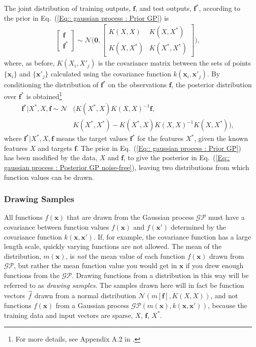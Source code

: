 \documentclass[twoside,english]{uiofysmaster}
\begin{document}
{{The joint distribution of training outputs, $\textbf{f}$, and test outputs, $\textbf{f}^*$, according to the prior in Eq.~(\ref{Eq:: gaussian process : Prior GP}) is
\begin{align}
\begin{bmatrix}
\textbf{f}\\
\textbf{f}^*
\end{bmatrix}
\sim 
\mathcal{N} \Bigg(
\boldsymbol{0},
\begin{bmatrix}
K(X, X) & K(X, X^*)\\
K(X, X^*) & K(X^*, X^*)
\end{bmatrix}
 \Bigg),
\end{align}
where, as before, $K(X_i, X'_j)$ is the covariance matrix between the sets of points $\{ \textbf{x}_i \}$ and $\{\textbf{x}'_j \}$ calculated using the covariance function $k(\textbf{x}_i, \textbf{x}'_j)$. By conditioning the distribution of $\textbf{f}^*$ on the observations $\textbf{f}$,  the posterior distribution over $\textbf{f}^*$ is obtained\footnote{For more details, see Appendix A.2 in \cite{rasmussen2006gaussian}.}  \cite{rasmussen2006gaussian} 
\begin{align}\label{Eq:: gaussian process : Posterior GP noise-free}
\textbf{f}^* \big| X^*, X, \textbf{f} \sim \mathcal{N}&(K(X^*, X)K(X, X)^{-1} \textbf{f},\\ &K(X^*, X^*) - K(X^*, X)K(X, X)^{-1}K(X, X^*)),
\end{align}
where $\textbf{f}^* | X^*, X, \textbf{f}$ means the target values $\textbf{f}^*$ for the features $X^*$, given the known features $X$ and targets $\textbf{f}$. The prior in Eq.~(\ref{Eq:: gaussian process : Prior GP}) has been modified by the data, $X$ and $\textbf{f}$, to give the posterior in Eq.~(\ref{Eq:: gaussian process : Posterior GP noise-free}), leaving two distributions from which function values can be drawn.


\subsubsection{Drawing Samples}
All functions $f(\textbf{x})$ that are drawn from the Gaussian process $\mathcal{GP}$ must have a covariance between function values $f(\textbf{x})$ and $f(\textbf{x}')$ determined by the covariance function $k(\textbf{x}, \textbf{x}')$. If, for example, the covariance function has a large length scale, quickly varying functions are not allowed. The mean of the distribution, $m(\textbf{x})$, is \textit{not} the mean value of each function $f(\textbf{x})$ drawn from $\mathcal{GP}$, but rather the mean function value you would get in $\textbf{x}$ if you drew enough functions from the $\mathcal{GP}$. Drawing functions from a distribution in this way will be referred to as \textit{drawing samples}. The samples drawn here will in fact be function vectors $\vec{f}$ drawn from a normal distribution $\mathcal{N}(m[\textbf{f}], K(X, X))$, and not functions $f(\textbf{x})$ from a Gaussian process $\mathcal{GP}(m(\textbf{x}), k(\textbf{x}, \textbf{x}'))$, because the training data and input vectors are sparse, $X$, $\textbf{f}$, $X^*$.

}}
\end{document}
